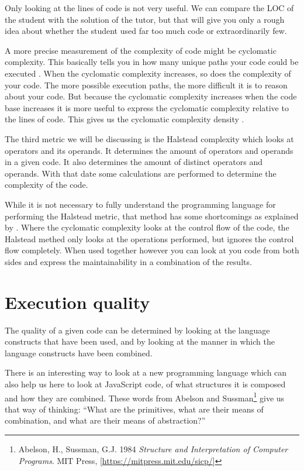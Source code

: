 Only looking at the lines of code is not very useful. We can compare the LOC of
the student with the solution of the tutor, but that will give you only a
rough idea about whether the student used far too much code or extraordinarily
few.

A more precise measurement of the complexity of code
might be cyclomatic complexity.
This basically tells you in how many
unique paths your code could be executed \citep{website:js-complexity}. When
the cyclomatic complexity increases, so does the complexity of your code. The
more possible execution paths, the more difficult it is to reason about your
code. But because the cyclomatic complexity increases when the code base
increases it is more useful to express the cyclomatic complexity relative to
the lines of code. This gives us the cyclomatic complexity density
\citep{gill1991cyclomatic}.

The third metric we will be discussing is the Halstead complexity which looks
at operators and its operands. It determines the amount of operators and
operands in a given code. It also determines the amount of distinct operators
and operands. With that date some calculations are performed to determine the
complexity of the code.

While it is not necessary to fully understand the programming language for
performing the Halstead metric, that method has some shortcomings as explained
by \citet{yu2010survey}. Where the cyclomatic complexity looks at the control
flow of the code, the Halstead methed only looks at the operations performed,
but ignores the control flow completely. When used together however you can look at you code from both sides and express the maintainability in a combination of the results.

\section{Execution quality}

The quality of a given code can be determined by looking at the language constructs
that have been used, and by looking at the manner in which the language constructs
have been combined.

There is an interesting way to look at a new programming language which can
also help us here to look at JavaScript code, of what structures it is composed
and how they are combined. These words from Abelson and
Sussman\footnote{Abelson, H., Sussman, G.J. 1984 {\em Structure and
Interpretation of Computer Programs}. MIT Press,
[\url{https://mitpress.mit.edu/sicp/}]} give us that way of thinking: ``What
are the primitives, what are their means of combination, and what are their
means of abstraction?''


